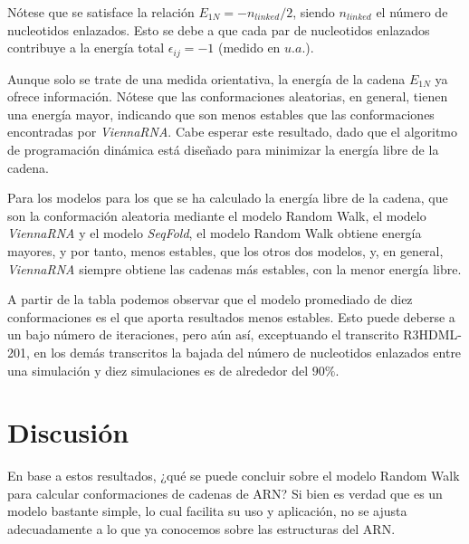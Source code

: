 \documentclass[a4paper,11pt,titlepage]{article}
\theoremstyle{definition}
\begin{document}
Nótese que se satisface la relación $E_{1N} = - n_{linked} / 2$, siendo $n_{linked}$ el número de nucleotidos enlazados. Esto se debe a que cada par de nucleotidos enlazados contribuye a la energía total $\epsilon_{ij} = -1$ (medido en $u.a.$). 

Aunque solo se trate de una medida orientativa, la energía de la cadena $E_{1N}$ ya ofrece información. Nótese que las conformaciones aleatorias, en general, tienen una energía mayor, indicando que son menos estables que las conformaciones encontradas por \textit{ViennaRNA}. Cabe esperar este resultado, dado que el algoritmo de programación dinámica está diseñado para minimizar la energía libre de la cadena.

Para los modelos para los que se ha calculado la energía libre de la cadena, que son la conformación aleatoria mediante el modelo Random Walk, el modelo \textit{ViennaRNA} y el modelo \textit{SeqFold}, el modelo Random Walk obtiene energía mayores, y por tanto, menos estables, que los otros dos modelos, y, en general, \textit{ViennaRNA} siempre obtiene las cadenas más estables, con la menor energía libre.

A partir de la tabla podemos observar que el modelo promediado de diez conformaciones es el que aporta resultados menos estables. Esto puede deberse a un bajo número de iteraciones, pero aún así, exceptuando el transcrito R3HDML-201, en los demás transcritos la bajada del número de nucleotidos enlazados entre una simulación y diez simulaciones es de alrededor del $90\%$. 

\section{Discusión}\label{sec:cnc}

En base a estos resultados, ¿qué se puede concluir sobre el modelo Random Walk para calcular conformaciones de cadenas de ARN? Si bien es verdad que es un modelo bastante simple, lo cual facilita su uso y aplicación, no se ajusta adecuadamente a lo que ya conocemos sobre las estructuras del ARN.
\end{document}
